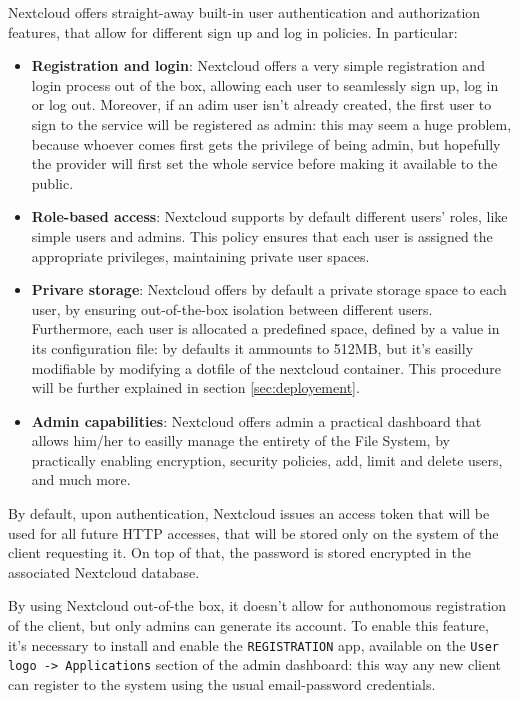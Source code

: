 \documentclass{article}
\begin{document}
	Nextcloud offers straight-away built-in user authentication and authorization features, that allow for different sign up and log in policies. In particular:
	\begin{itemize}
		\item \textbf{Registration and login}: Nextcloud offers a very simple registration and login process out of the box, allowing each user to seamlessly sign up, log in or log out. Moreover, if an adim user isn't already created, the first user to sign to the service will be registered as admin: this may seem a huge problem, because whoever comes first gets the privilege of being admin, but hopefully the provider will first set the whole service before making it available to the public.
	
		\item \textbf{Role-based access}: Nextcloud supports by default different users' roles, like simple users and admins. This policy ensures that each user is assigned the appropriate privileges, maintaining private user spaces.
		
		\item \textbf{Privare storage}: Nextcloud offers by default a private storage space to each user, by ensuring out-of-the-box isolation between different users. Furthermore, each user is allocated a predefined space, defined by a value in its configuration file: by defaults it ammounts to 512MB, but it's easilly modifiable by modifying a dotfile of the nextcloud container. This procedure will be further explained in section \ref{sec:deployement}.
		
		\item \textbf{Admin capabilities}: Nextcloud offers admin a practical dashboard that allows him/her to easilly manage the entirety of the File System, by practically enabling encryption, security policies, add, limit and delete users, and much more.
	\end{itemize}
	
	By default, upon authentication, Nextcloud issues an access token that will be used for all future HTTP accesses, that will be stored only on the system of the client requesting it. On top of that, the password is stored encrypted in the associated Nextcloud database.
	
	By using Nextcloud out-of-the box, it doesn't allow for authonomous registration of the client, but only admins can generate its account. To enable this feature, it's necessary to install and enable the \verb|REGISTRATION| app, available on the \verb|User logo -> Applications| section of the admin dashboard: this way any new client can register to the system using the usual email-password credentials.
	
\end{document}
